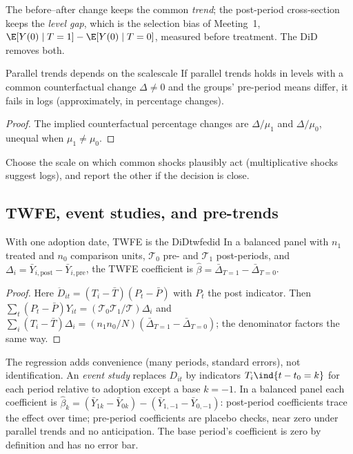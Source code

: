\documentclass[11pt]{article}
\begin{document}
The before--after change keeps the common \emph{trend}; the post-period cross-section keeps the \emph{level gap}, which is the selection bias of
Meeting~1, $\E[Y(0) \mid T=1] - \E[Y(0) \mid T=0]$, measured before treatment. The DiD removes both.

\begin{prop}{Parallel trends depends on the scale}{scale}
If parallel trends holds in levels with a common counterfactual change $\Delta \ne 0$ and the groups' pre-period means differ, it fails in
logs (approximately, in percentage changes).
\end{prop}
\begin{proof}
The implied counterfactual percentage changes are $\Delta/\mu_1$ and $\Delta/\mu_0$, unequal when $\mu_1 \ne \mu_0$.
\end{proof}
Choose the scale on which common shocks plausibly act (multiplicative shocks suggest logs), and report the other if the decision is close.

\subsection{TWFE, event studies, and pre-trends}

\begin{prop}{With one adoption date, TWFE is the DiD}{twfedid}
In a balanced panel with $n_1$ treated and $n_0$ comparison units, $\mathcal T_0$ pre- and $\mathcal T_1$ post-periods, and
$\Delta_i = \bar Y_{i,\text{post}} - \bar Y_{i,\text{pre}}$, the TWFE coefficient is $\hat\beta = \bar\Delta_{T=1} - \bar\Delta_{T=0}$.
\end{prop}
\begin{proof}
Here $\ddot D_{it} = (T_i - \bar T)(P_t - \bar P)$ with $P_t$ the post indicator. Then $\sum_t(P_t - \bar P)Y_{it} = (\mathcal T_0\mathcal T_1/\mathcal T)\Delta_i$ and
$\sum_i(T_i - \bar T)\Delta_i = (n_1n_0/N)(\bar\Delta_{T=1} - \bar\Delta_{T=0})$; the denominator factors the same way.
\end{proof}

The regression adds convenience (many periods, standard errors), not identification. An \emph{event study} replaces $D_{it}$ by indicators
$T_i\ind{t - t_0 = k}$ for each period relative to adoption except a base $k = -1$. In a balanced panel each coefficient is
$\hat\beta_k = (\bar Y_{1k} - \bar Y_{0k}) - (\bar Y_{1,-1} - \bar Y_{0,-1})$: post-period coefficients trace the effect over time; pre-period
coefficients are placebo checks, near zero under parallel trends and no anticipation. The base period's coefficient is zero by definition and
has no error bar.
\end{document}
